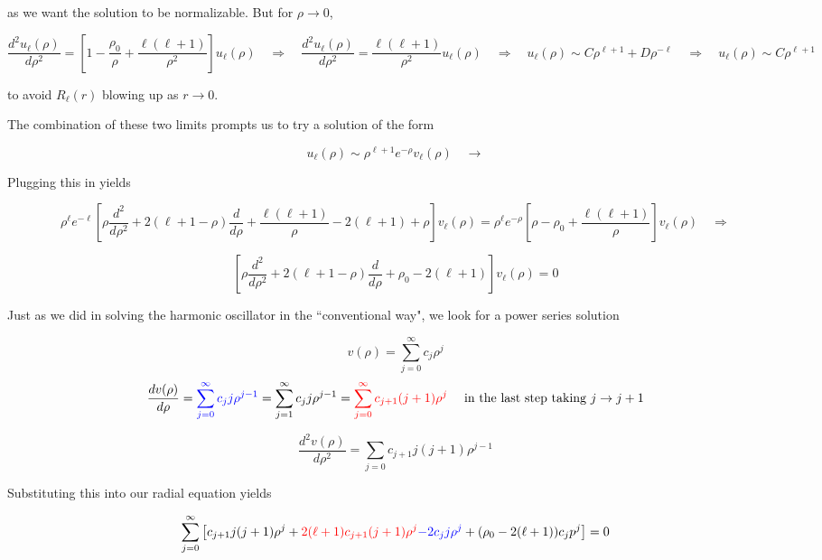 as we want the solution to be normalizable. But for $\rho \rightarrow 0$, 

\[
\frac{d^2 u_\ell (\rho)}{d \rho^2} = \left[ 1 -\frac{\rho_0}{\rho} + \frac{\ell
(\ell + 1)}{\rho^2} \right] u_\ell (\rho) \quad \Rightarrow \quad \frac{d^2
u_\ell (\rho)}{d \rho^2} = \frac{\ell (\ell +1)}{\rho^2} u_\ell (\rho) \quad
\Rightarrow \quad u_\ell (\rho) \sim C\rho^{\ell +1} + D\rho^{-\ell } \quad
\Rightarrow \quad u_\ell (\rho) \sim C\rho^{\ell +1}
\] \vspace{3px}

to avoid $R_\ell (r)$ blowing up as $r\rightarrow 0$. 

The combination of these two limits prompts us to try a solution of the form 

\[
  u_\ell (\rho) \sim \rho^{\ell +1} e^{-\rho} v_\ell (\rho) \quad \rightarrow 
\] \vspace{3px}


Plugging this in yields

\[ \rho^\ell e^{-\ell } \left[ \rho \frac{d^2 }{d \rho^2} + 2(\ell  + 1 - \rho)
\frac{d }{d \rho} + \frac{\ell (\ell +1)}{\rho} - 2(\ell +1) + \rho \right]
v_\ell (\rho) = \rho^\ell e^{-\rho} \left[ \rho - \rho_0 + \frac{\ell (\ell
+1)}{\rho} \right] v_\ell (\rho) \quad \Rightarrow \]

\[ \left[ \rho \frac{d^2 }{d \rho^2} + 2(\ell +1 - \rho) \frac{d }{d \rho} + \rho_0
- 2(\ell +1) \right] v_\ell (\rho) = 0 \] \vspace{3px}


Just as we did in solving the harmonic oscillator in the ``conventional way",
we look for a power series solution 

\[
v(\rho) = \sum_{j=0}^{\infty} c_j \rho^j
\] 
\[ \frac{d v(\rho)}{d \rho} = \textcolor{blue}{ \sum_{j=0}^{\infty} c_j
  j \rho^{j-1} } = \sum_{j=1}^{\infty} c_j j \rho^{j -1}
= \textcolor{red}{\sum_{j=0}^{\infty}c_{j+1} (j+1) \rho^j} \quad \text{ in the last
step taking }  j \rightarrow j+1 \]

\[ \frac{d^2 v(\rho)}{d \rho^2} = \sum_{j=0}^{} c_{j+1} j (j+1) \rho^{j-1}
    \] \vspace{3px}

Substituting this into our radial equation yields 

\[
  \sum_{j=0}^{\infty} \left[ c_{j+1} j(j+1) \rho^j + \textcolor{red}{ 2(\ell +1)
    c_{j+1} (j+1) \rho^j} \textcolor{blue}{- 2c_j j \rho^j } + (\rho_0 - 2(\ell
  +1))c_j p^j \right] = 0
\] \vspace{3px}

